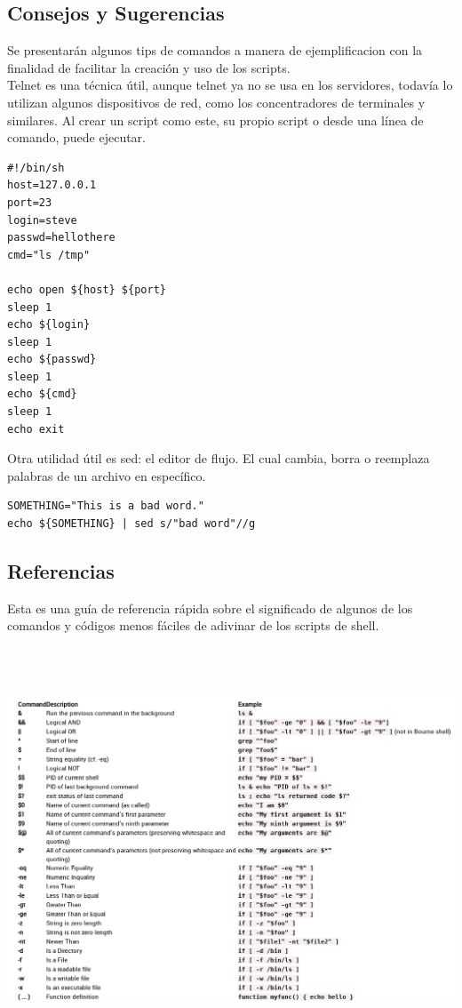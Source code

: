 \documentclass[12pt]{article}
\begin{document}
\subsection*{Consejos y Sugerencias}
Se presentarán algunos tips de comandos a manera de ejemplificacion con la finalidad de facilitar la creación y uso de los scripts.\\
Telnet es una técnica útil, aunque telnet ya no se usa en los servidores, todavía lo utilizan algunos dispositivos de red, como los concentradores de terminales y similares. Al crear un script como este, su propio script o desde una línea de comando, puede ejecutar.
\begin{verbatim}
#!/bin/sh
host=127.0.0.1
port=23
login=steve
passwd=hellothere
cmd="ls /tmp"

echo open ${host} ${port}
sleep 1
echo ${login}
sleep 1
echo ${passwd}
sleep 1
echo ${cmd}
sleep 1
echo exit
\end{verbatim}
Otra utilidad útil es sed: el editor de flujo. El cual cambia, borra o reemplaza palabras de un archivo en específico.
\begin{verbatim}
SOMETHING="This is a bad word."
echo ${SOMETHING} | sed s/"bad word"//g
\end{verbatim}
\subsection*{Referencias}
Esta es una guía de referencia rápida sobre el significado de algunos de los comandos y códigos menos fáciles de adivinar de los scripts de shell.
\begin{center}
	\includegraphics[height=12cm]{referencias.png}
\end{center}
\end{document}
